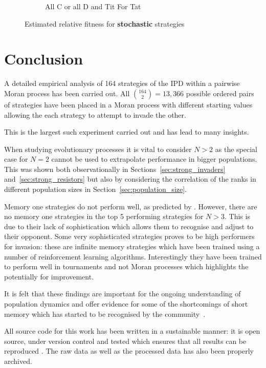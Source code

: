 \documentclass{article}
\begin{document}
\begin{figure}[!hbtp]
\begin{subfigure}[t]{.3\textwidth}
        \caption{All C or all D and Tit For Tat}
    \end{subfigure}%
    \caption{Estimated relative fitness
             for \textbf{stochastic} strategies}
    \label{fig:comparison_stochastic}
\end{figure}


\section{Conclusion}\label{sec:conclusion}

A detailed empirical analysis of 164 strategies of the IPD within a pairwise
Moran process has been carried out. All \(\binom{164}{2}=13,366\) possible
ordered pairs of strategies have been placed in a Moran process with different
starting values allowing the each strategy to attempt to invade the other.

This is the largest such experiment carried out and has lead to many insights.

When studying evolutionary processes it is vital to consider \(N>2\) as the
special case for \(N=2\) cannot be used to extrapolate performance in bigger
populations. This was shown both observationally in
Sections~\ref{sec:strong_invaders} and~\ref{sec:strong_resistors} but also by
considering the correlation of the ranks in different population sizes in
Section~\ref{sec:population_size}.

Memory one strategies do not perform well, as predicted by \cite{Press2012}.
However, there are no memory one strategies in the top 5 performing strategies
for \(N>3\). This is due to their lack of sophistication which allows them to
recognise and adjust to their opponent. Some very sophisticated strategies
proves to be high performers for invasion: these are infinite memory strategies
which have been trained using a number of reinforcement learning algorithms.
Interestingly they have been trained to perform well in tournaments and not
Moran processes which highlights the potentially for improvement.

It is felt that these findings are important for the ongoing understanding of
population dynamics and offer evidence for some of the shortcomings of short
memory which has started to be recognised by the community~\cite{Hilbe2017}.

All source code for this work has been written in a sustainable manner: it is
open source, under version control and tested which ensures that all results can
be reproduced \cite{Prlic2012, Sandve2013, Wilson2014}. The raw data as well as
the processed data has also been properly archived.
\end{document}
